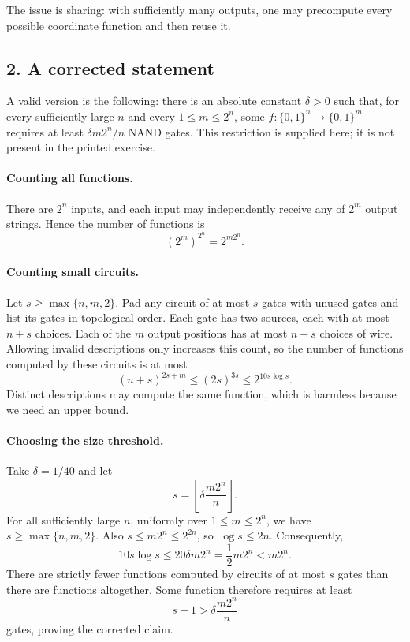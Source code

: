 \documentclass[UTF8,fontset=fandol,11pt,a4paper]{ctexart}
\newcommand{\bits}{\{0,1\}}
\begin{document}
The issue is sharing: with sufficiently many outputs, one may
precompute every possible coordinate function and then reuse it.

\subsection*{2. A corrected statement}
A valid version is the following: there is an absolute constant
$\delta>0$ such that, for every sufficiently large $n$ and every
$1\le m\le2^n$, some $f:\bits^n\to\bits^m$ requires at least
$\delta m2^n/n$ NAND gates. This restriction is supplied here; it
is not present in the printed exercise.

\paragraph{Counting all functions.}
There are $2^n$ inputs, and each input may independently receive any
of $2^m$ output strings. Hence the number of functions is
\[
 (2^m)^{2^n}=2^{m2^n}.
\]

\paragraph{Counting small circuits.}
Let $s\ge\max\{n,m,2\}$. Pad any circuit of at most $s$ gates
with unused gates and list its gates in topological order.
Each gate has two sources, each with at most $n+s$ choices.
Each of the $m$ output positions has at most $n+s$ choices of wire.
Allowing invalid descriptions only increases this count, so the
number of functions computed by these circuits is at most
\[
 (n+s)^{2s+m}\le(2s)^{3s}\le2^{10s\log s}.
\]
Distinct descriptions may compute the same function, which is
harmless because we need an upper bound.

\paragraph{Choosing the size threshold.}
Take $\delta=1/40$ and let
\[
 s=\left\lfloor\delta\frac{m2^n}{n}\right\rfloor.
\]
For all sufficiently large $n$, uniformly over $1\le m\le2^n$,
we have $s\ge\max\{n,m,2\}$. Also
$s\le m2^n\le2^{2n}$, so $\log s\le2n$. Consequently,
\[
 10s\log s\le20\delta m2^n=\frac12m2^n<m2^n.
\]
There are strictly fewer functions computed by circuits of at most
$s$ gates than there are functions altogether. Some function
therefore requires at least
\[
 s+1>\delta\frac{m2^n}{n}
\]
gates, proving the corrected claim.
\end{document}
